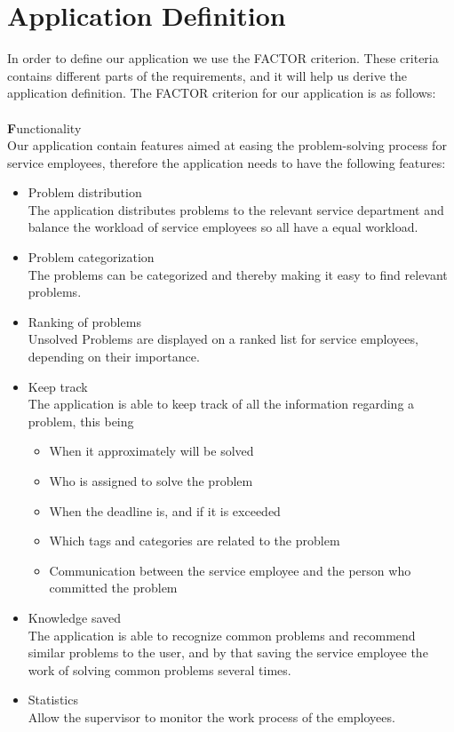 \section{Application Definition}
\label{sec:factor}
\label{sec:systemdefinition}
In order to define our application we use the FACTOR criterion. \cite[p.~39]{roedeaalborg} These criteria contains different parts of the requirements, and it will help us derive the application definition.
The FACTOR criterion for our application is as follows: \\
\ \\
{\Large \textbf{F}}unctionality \\
Our application contain features aimed at easing the problem-solving process for service employees, therefore the application needs to have the following features:
\begin{itemize}
\item Problem distribution\\
The application distributes problems to the relevant service department and balance the workload of service employees so all have a equal workload. 
\item Problem categorization \\
The problems can be categorized and thereby making it easy to find relevant problems.
\item Ranking of problems \\
Unsolved Problems are displayed on a ranked list for service employees, depending on their importance.
\item Keep track \\
The application is able to keep track of all the information regarding a problem, this being
\begin{itemize}
	\item When it approximately will be solved
	\item Who is assigned to solve the problem
	\item When the deadline is, and if it is exceeded
	\item Which tags and categories are related to the problem 
	\item Communication between the service employee and the person who committed the problem
\end{itemize}
\item Knowledge saved \\
The application is able to recognize common problems and recommend similar problems to the user, and by that saving the service employee the work of solving common problems several times. 
\item Statistics \\
Allow the supervisor to monitor the work process of the employees.
\end{itemize}
